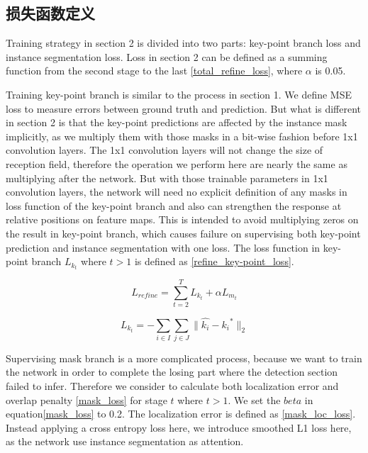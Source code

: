 \subsection{损失函数定义}
\label{subsec:lossfunctions}
Training strategy in section 2 is divided into two parts: key-point branch loss and instance segmentation loss. Loss in section 2 can be defined as a summing function from the second stage to the last \eqref{total_refine_loss}, where $\alpha$ is 0.05.

Training key-point branch is similar to the process in section 1. We define MSE loss to measure errors between ground truth and prediction. But what is different in section 2 is that the key-point predictions are affected by the instance mask implicitly, as we multiply them with those masks in a bit-wise fashion before 1x1 convolution layers. The 1x1 convolution layers will not change the size of reception field, therefore the operation we perform here are nearly the same as multiplying after the network. But with those trainable parameters in 1x1 convolution layers, the network will need no explicit definition of any masks in loss function of the key-point branch and also can strengthen the response at relative positions on feature maps. This is intended to avoid multiplying zeros on the result in key-point branch, which causes failure on supervising both key-point prediction and instance segmentation with one loss. The loss function in key-point branch $L_{k_t}$ where $t>1$ is defined as \eqref{refine_key-point_loss}. 

\begin{equation}
\label{total_refine_loss}
L_{refine} = \sum_{t=2}^{T}{L_{k_t} + \alpha L_{m_t}}
\end{equation}

\begin{equation}
\label{refine_key-point_loss}
L_{k_{t}} = -\sum_{i \in I}\sum_{j \in J}{\parallel \hat{k_i} - {k_i}^{*} \parallel_2}
\end{equation}

Supervising mask branch is a more complicated process, because we want to train the network in order to complete the losing part where the detection section failed to infer. Therefore we consider to calculate both localization error and overlap penalty \eqref{mask_loss} for stage $t$ where $t>1$. We set the $beta$ in equation\eqref{mask_loss} to 0.2. The localization error is defined as \eqref{mask_loc_loss}. Instead applying a cross entropy loss here, we introduce smoothed L1 loss here, as the network use instance segmentation as attention.

